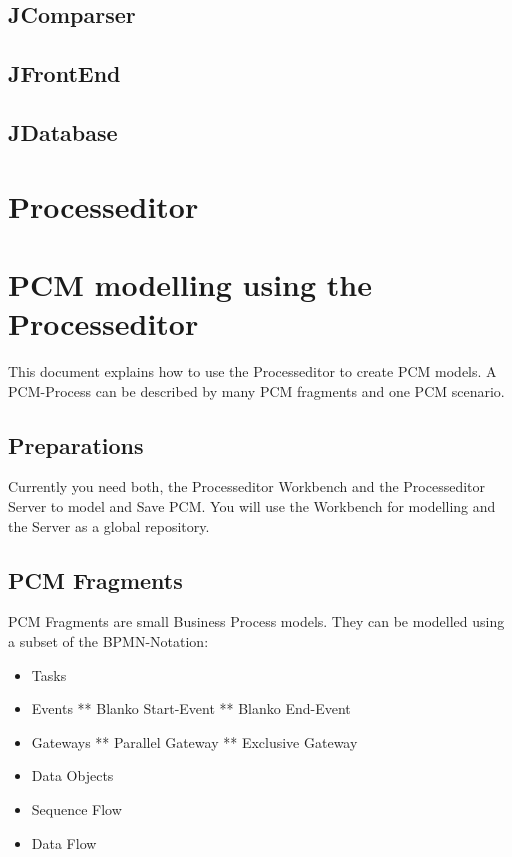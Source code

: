 \documentclass{acm_proc_article-sp}
\begin{document}
%
%
\subsection{JComparser}

%
%
\subsection{JFrontEnd}

%
%
\subsection{JDatabase}

%
%
\section{Processeditor}

%
%
\section{PCM modelling using the Processeditor}\label{pcm-modelling-using-the-processeditor}
This document explains how to use the Processeditor to create PCM
models. A PCM-Process can be described by many PCM fragments and one PCM
scenario.

%
%
\subsection{Preparations}\label{preparations}
Currently you need both, the Processeditor Workbench and the
Processeditor Server to model and Save PCM. You will use the Workbench
for modelling and the Server as a global repository.

%
%
\subsection{PCM Fragments}\label{pcm-fragments}

PCM Fragments are small Business Process models. They can be modelled
using a subset of the BPMN-Notation:

\begin{itemize}
\itemsep1pt\parskip0pt
\item
  Tasks
\item
  Events ** Blanko Start-Event ** Blanko End-Event
\item
  Gateways ** Parallel Gateway ** Exclusive Gateway
\item
  Data Objects
\item
  Sequence Flow
\item
  Data Flow
\end{itemize}
\end{document}
